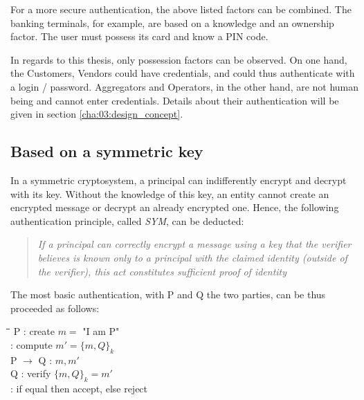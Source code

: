 For a more secure authentication, the above listed factors can be combined. The banking terminals, for example, are based on a knowledge and an ownership factor. The user must possess its card and know a PIN code.

In regards to this thesis, only possession factors can be observed. On one hand, the Customers, Vendors could have credentials, and could thus authenticate with a login / password. Aggregators and Operators, in the other hand, are not human being and cannot enter credentials. Details about their authentication will be given in section \ref{cha:03:design_concept}.


\subsection{Based on a symmetric key}
In a symmetric cryptosystem, a principal can indifferently encrypt and decrypt with its key. Without the knowledge of this key, an entity cannot create an encrypted message or decrypt an already encrypted one. Hence, the following authentication principle, called \emph{SYM}, can be deducted\cite{Woo1997}:

\begin{quote}
	\textit{If a principal can correctly encrypt a message using a key that the verifier believes is known
	only to a principal with the claimed identity (outside of the verifier), this act constitutes sufficient proof of identity}
\end{quote}

The most basic authentication, with P and Q the two parties, can be thus proceeded as follows:

\begin{tabbing}
	\hspace{4em}\=\hspace{4em}\=\hspace{2em}\=\kill
	\>  P \>  : \> create $m =$ "I am P" \\
	\>    \>  : \> compute $m' = \lbrace m, Q \rbrace_{k}$ 				\\
	\>  P $\rightarrow$ Q \>  : \> $m,m'$ \\
	\>  Q \>  : \> verify $\lbrace m, Q \rbrace_{k} = m'$ \\
		\>    \>  : \> if equal then accept, else reject \\
\end{tabbing} 

